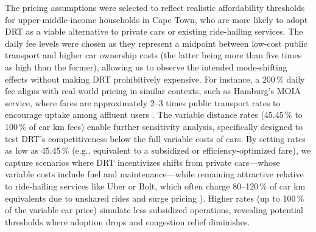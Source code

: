 \documentclass[main.tex]{subfiles}
\begin{document}
The pricing assumptions were selected to reflect realistic affordability thresholds for upper-middle-income households in Cape Town, who are more likely to adopt DRT as a viable alternative to private cars or existing ride-hailing services. The daily fee levels were chosen as they represent a midpoint between low-cost public transport and higher car ownership costs (the latter being more than five times as high than the former), allowing us to observe the intended mode-shifting effects without making DRT prohibitively expensive. For instance, a 200\,\% daily fee aligns with real-world pricing in similar contexts, such as Hamburg's MOIA service, where fares are approximately 2–3 times public transport rates to encourage uptake among affluent users \citep{KagerbauerKostorzWilkes2021_1000141282}. The variable distance rates (45.45\,\% to 100\,\% of car km fees) enable further sensitivity analysis, specifically designed to test DRT's competitiveness below the full variable costs of cars. By setting rates as low as 45.45\,\% (e.g., equivalent to a subsidized or efficiency-optimized fare), we capture scenarios where DRT incentivizes shifts from private cars—whose variable costs include fuel and maintenance—while remaining attractive relative to ride-hailing services like Uber or Bolt, which often charge 80–120\,\% of car km equivalents due to unshared rides and surge pricing \citep{Tirachini2020-sr}). Higher rates (up to 100\,\% of the variable car price) simulate less subsidized operations, revealing potential thresholds where adoption drops and congestion relief diminishes. 
\end{document}
